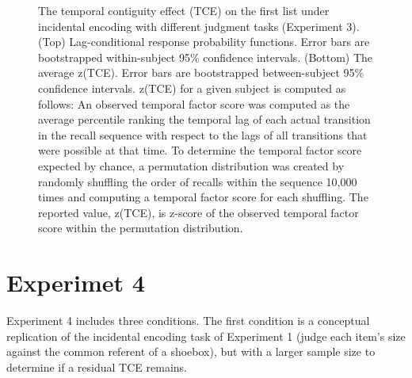\documentclass[man,natbib,floatsintext]{apa6} %
\begin{document}
  


\color{black}

\begin{figure}%
\caption{The temporal contiguity effect (TCE) on the first list under incidental encoding with different judgment tasks (Experiment 3). (Top) Lag-conditional response probability functions. Error bars are bootstrapped within-subject 95\% confidence intervals. (Bottom) The average z(TCE).  Error bars are bootstrapped between-subject 95\% confidence intervals. z(TCE) for a given subject is computed as follows: An observed temporal factor score was computed as the average percentile ranking the temporal lag of each actual transition in the recall sequence with respect to the lags of all transitions that were possible at that time. To determine the temporal factor score expected by chance, a permutation distribution was created by randomly shuffling the order of recalls within the sequence 10,000 times and computing a temporal factor score for each shuffling. The reported value, z(TCE), is z-score of the observed temporal factor score within the permutation distribution.}
\label{e3_l1_crp}
\end{figure}


\color{red}
\section{Experimet 4}
\label{newexp}





Experiment 4 includes three conditions. The first condition is a conceptual replication of the incidental encoding task of Experiment 1 (judge each item's size against the common referent of a shoebox), but with a larger sample size to determine if a residual TCE remains. 
\end{document}
